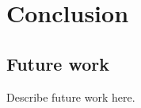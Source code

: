 \chapter{Conclusion}\label{ch:conclusion}

\section{Future work}\label{sec:future-work}
Describe future work here.